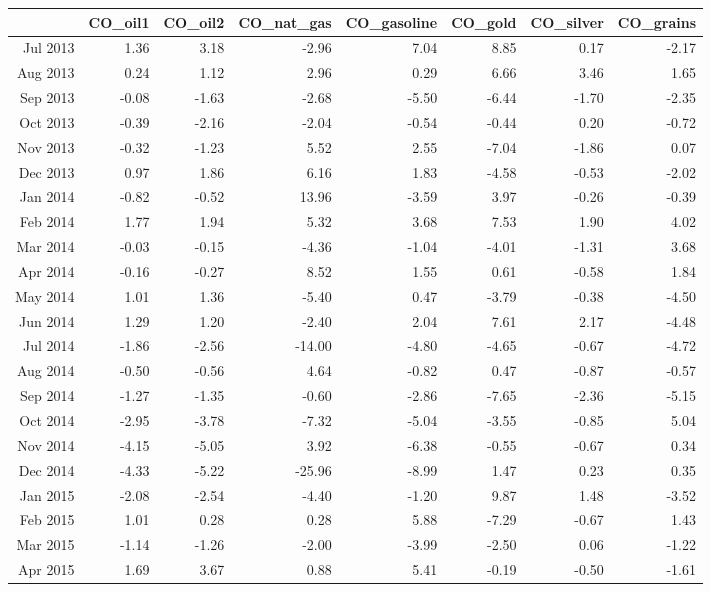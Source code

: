 \begin{tabularx}{\textwidth}{rrrrrrrr}
  \hline
 & CO\_oil1 & CO\_oil2 & CO\_nat\_gas & CO\_gasoline & CO\_gold & CO\_silver & CO\_grains \\ 
  \hline
Jul 2013 & 1.36 & 3.18 & -2.96 & 7.04 & 8.85 & 0.17 & -2.17 \\ 
  Aug 2013 & 0.24 & 1.12 & 2.96 & 0.29 & 6.66 & 3.46 & 1.65 \\ 
  Sep 2013 & -0.08 & -1.63 & -2.68 & -5.50 & -6.44 & -1.70 & -2.35 \\ 
  Oct 2013 & -0.39 & -2.16 & -2.04 & -0.54 & -0.44 & 0.20 & -0.72 \\ 
  Nov 2013 & -0.32 & -1.23 & 5.52 & 2.55 & -7.04 & -1.86 & 0.07 \\ 
  Dec 2013 & 0.97 & 1.86 & 6.16 & 1.83 & -4.58 & -0.53 & -2.02 \\ 
  Jan 2014 & -0.82 & -0.52 & 13.96 & -3.59 & 3.97 & -0.26 & -0.39 \\ 
  Feb 2014 & 1.77 & 1.94 & 5.32 & 3.68 & 7.53 & 1.90 & 4.02 \\ 
  Mar 2014 & -0.03 & -0.15 & -4.36 & -1.04 & -4.01 & -1.31 & 3.68 \\ 
  Apr 2014 & -0.16 & -0.27 & 8.52 & 1.55 & 0.61 & -0.58 & 1.84 \\ 
  May 2014 & 1.01 & 1.36 & -5.40 & 0.47 & -3.79 & -0.38 & -4.50 \\ 
  Jun 2014 & 1.29 & 1.20 & -2.40 & 2.04 & 7.61 & 2.17 & -4.48 \\ 
  Jul 2014 & -1.86 & -2.56 & -14.00 & -4.80 & -4.65 & -0.67 & -4.72 \\ 
  Aug 2014 & -0.50 & -0.56 & 4.64 & -0.82 & 0.47 & -0.87 & -0.57 \\ 
  Sep 2014 & -1.27 & -1.35 & -0.60 & -2.86 & -7.65 & -2.36 & -5.15 \\ 
  Oct 2014 & -2.95 & -3.78 & -7.32 & -5.04 & -3.55 & -0.85 & 5.04 \\ 
  Nov 2014 & -4.15 & -5.05 & 3.92 & -6.38 & -0.55 & -0.67 & 0.34 \\ 
  Dec 2014 & -4.33 & -5.22 & -25.96 & -8.99 & 1.47 & 0.23 & 0.35 \\ 
  Jan 2015 & -2.08 & -2.54 & -4.40 & -1.20 & 9.87 & 1.48 & -3.52 \\ 
  Feb 2015 & 1.01 & 0.28 & 0.28 & 5.88 & -7.29 & -0.67 & 1.43 \\ 
  Mar 2015 & -1.14 & -1.26 & -2.00 & -3.99 & -2.50 & 0.06 & -1.22 \\ 
  Apr 2015 & 1.69 & 3.67 & 0.88 & 5.41 & -0.19 & -0.50 & -1.61 \\ 

\end{tabularx}
